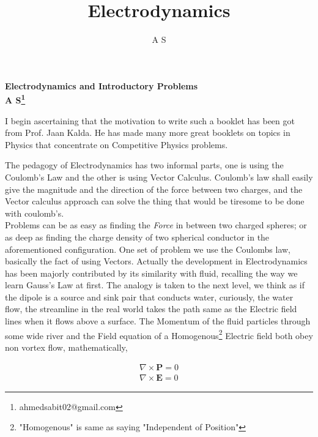 \documentclass[11pt,a4paper,twocolumn,openright]{article}
\author{A S}
\title{Electrodynamics}
\renewcommand{\vec}[1]{\boldsymbol{#1}}
\theoremstyle{definition}
\theoremstyle{definition}
\theoremstyle{definition}
\theoremstyle{definition}
\begin{document}
\textsf{\textbf{Electrodynamics and Introductory Problems }}\\
\textsf{\textbf{A S\footnote{ahmedsabit02@gmail.com}}}

I begin ascertaining that the motivation to write such a booklet has been got from Prof. Jaan Kalda. He has made many more great booklets on topics in Physics that concentrate on Competitive Physics problems.

The pedagogy of Electrodynamics has two informal parts, one is using the Coulomb's Law and the other is using Vector Calculus. Coulomb's law shall easily give the magnitude and the direction of the force between two charges, and the Vector calculus approach can solve the thing that would be tiresome to be done with coulomb's. \\
%
Problems can be as easy as finding the \emph{Force} in between two charged spheres; or as deep as finding the charge density of two spherical conductor in the aforementioned configuration. One set of problem we use the Coulombs law, basically the fact of using Vectors. 
 Actually the development in Electrodynamics has been majorly contributed by its similarity with fluid, recalling the way we learn Gauss's Law at first.
%
The analogy is taken to the next level, we think as if the dipole is a source and sink pair that conducts water, curiously, the water flow, the streamline in the real world takes the path same as the Electric field lines when it flows above a surface.
%
The Momentum of the fluid particles through some wide river and the Field equation of a Homogenous\footnote{"Homogenous" is same as saying "Independent of Position"} Electric field both obey non vortex flow, mathematically,

\begin{align*}
\nabla \times \vec{P} = 0 \\
\nabla \times \vec{E} = 0 
\end{align*}
\end{document}
